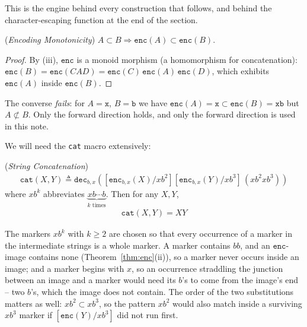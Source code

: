\documentclass[runningheads,envcountsect]{llncs}
\renewenvironment{remark}
  {\rmfamily\trivlist\item[\hskip\labelsep{\itshape Remark.}]\ignorespaces}
  {\endtrivlist}
\begin{document}
This is the engine behind every construction that follows, and behind the character-escaping function at the end of the section.

\begin{lemma}
    (\emph{Encoding Monotonicity})
    $A\subset B \Rightarrow \mathtt{enc}(A)\subset \mathtt{enc}(B)$.
\end{lemma}

\begin{proof}
    By (iii), $\mathtt{enc}$ is a monoid morphism (a homomorphism for concatenation): $\mathtt{enc}(B) = \mathtt{enc}(CAD) = \mathtt{enc}(C)\,\mathtt{enc}(A)\,\mathtt{enc}(D)$, which exhibits $\mathtt{enc}(A)$ inside $\mathtt{enc}(B)$.
\end{proof}

\begin{remark}
    The converse \emph{fails}: for $A = \mathtt{x}$, $B = \mathtt{b}$ we have $\mathtt{enc}(A) = \mathtt{x} \subset \mathtt{enc}(B) = \mathtt{xb}$ but $A \not\subset B$. Only the forward direction holds, and only the forward direction is used in this note.
\end{remark}

We will need the \texttt{cat} macro extensively:

\begin{theorem}
    (\emph{String Concatenation})
    \label{thm:cat}
    \begin{align}
        \mathtt{cat}(X,Y) \triangleq \mathtt{dec}_{b,x}\left([\mathtt{enc}_{b,x}(X)/xb^2][\mathtt{enc}_{b,x}(Y)/xb^3]\,(xb^2xb^3)\right)
    \end{align}
    where $xb^k$ abbreviates $\underbrace{xb\cdots b}_{k\text{ times}}$. Then for any $X,Y$,
    \begin{align}
        \mathtt{cat}(X,Y) = XY
    \end{align}
\end{theorem}

\begin{remark}
    \label{rem:cat-markers}
    The markers $xb^k$ with $k \ge 2$ are chosen so that every occurrence of a marker in the intermediate strings is a whole marker. A marker contains $bb$, and an $\mathtt{enc}$-image contains none (Theorem~\ref{thm:enc}(ii)), so a marker never occurs inside an image; and a marker begins with $x$, so an occurrence straddling the junction between an image and a marker would need its $b$'s to come from the image's end -- two $b$'s, which the image does not contain. The order of the two substitutions matters as well: $xb^2 \subset xb^3$, so the pattern $xb^2$ would also match inside a surviving $xb^3$ marker if $[\mathtt{enc}(Y)/xb^3]$ did not run first.
\end{remark}
\end{document}
